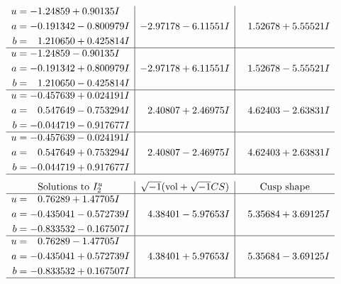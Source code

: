 \documentclass[1p]{elsarticle_modified}
\theoremstyle{definition}
\newcommand{\I}{\sqrt{-1}}
\begin{document}
$$\begin{array}{c|c|c}
\begin{aligned}
u &= -1.24859 + 0.90135 I \\
a &= -0.191342 - 0.800979 I \\
b &= \phantom{-}1.210650 + 0.425814 I\end{aligned}
 & -2.97178 - 6.11551 I & \phantom{-}1.52678 + 5.55521 I \\ \hline\begin{aligned}
u &= -1.24859 - 0.90135 I \\
a &= -0.191342 + 0.800979 I \\
b &= \phantom{-}1.210650 - 0.425814 I\end{aligned}
 & -2.97178 + 6.11551 I & \phantom{-}1.52678 - 5.55521 I \\ \hline\begin{aligned}
u &= -0.457639 + 0.024191 I \\
a &= \phantom{-}0.547649 - 0.753294 I \\
b &= -0.044719 - 0.917677 I\end{aligned}
 & \phantom{-}2.40807 + 2.46975 I & \phantom{-}4.62403 - 2.63831 I \\ \hline\begin{aligned}
u &= -0.457639 - 0.024191 I \\
a &= \phantom{-}0.547649 + 0.753294 I \\
b &= -0.044719 + 0.917677 I\end{aligned}
 & \phantom{-}2.40807 - 2.46975 I & \phantom{-}4.62403 + 2.63831 I\\
 \hline 
 \end{array}$$\newpage$$\begin{array}{c|c|c}  
\text{Solutions to }I^u_{2}& \I (\text{vol} + \sqrt{-1}CS) & \text{Cusp shape}\\
 \hline 
\begin{aligned}
u &= \phantom{-}0.76289 + 1.47705 I \\
a &= -0.435041 - 0.572739 I \\
b &= -0.833532 - 0.167507 I\end{aligned}
 & \phantom{-}4.38401 - 5.97653 I & \phantom{-}5.35684 + 3.69125 I \\ \hline\begin{aligned}
u &= \phantom{-}0.76289 - 1.47705 I \\
a &= -0.435041 + 0.572739 I \\
b &= -0.833532 + 0.167507 I\end{aligned}
 & \phantom{-}4.38401 + 5.97653 I & \phantom{-}5.35684 - 3.69125 I\\
 \hline 
 \end{array}$$\newpage
\end{document}
